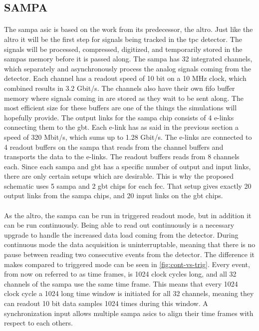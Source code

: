 \documentclass[a4paper, 12pt]{report}
\begin{document}
\subsection{SAMPA}
\label{subsec:sampa}
\paragraph{}
The \gls{sampa} \gls{asic} is based on the work from its predecessor, the \gls{altro}.
Just like the \gls{altro} it will be the first step for signals being tracked in the \gls{tpc} detector.
The signals will be processed, compressed, digitized, and temporarily stored in the \glspl{sampa} memory before it is passed along.
The \gls{sampa} has 32 integrated channels, which separately and asynchronously process the analog signals coming from the detector\cite{tdr-016}.
Each channel has a readout speed of 10 bit on a 10 MHz clock, which combined results in 3.2 Gbit/s.
The channels also have their own \gls{fifo} buffer memory where signals coming in are stored as they wait to be sent along.
The most efficient size for these buffers are one of the things the simulations will hopefully provide.
The output links for the \gls{sampa} chip consists of 4 e-links connecting them to the \gls{gbt}.
Each e-link has as said in the previous section a speed of 320 Mbit/s, which sums up to 1.28 Gbit/s\cite{tdr-015}.
The e-links are connected to 4 readout buffers on the \gls{sampa} that reads from the channel buffers and transports the data to the e-links.
The readout buffers reads from 8 channels each.
Since each \gls{sampa} and \gls{gbt} has a specific number of output and input links, there are only certain setups which are desirable.
This is why the proposed schematic uses 5 \gls{sampa} and 2 \gls{gbt} chips for each \gls{fec}.
That setup gives exactly 20 output links from the \gls{sampa} chips, and 20 input links on the \gls{gbt} chips.

\paragraph{}
As the \gls{altro}, the \gls{sampa} can be run in triggered readout mode, but in addition it can be run continuously.
Being able to read out continuously is a necessary upgrade to handle the increased data load coming from the detector.
During continuous mode the data acquisition is uninterruptable, meaning that there is no pause between reading two consecutive events from the detector.
The difference it makes compared to triggered mode can be seen in \ref{fig:cont-vs-trig}.
Every event, from now on referred to as time frames, is 1024 clock cycles long, and all 32 channels of the \gls{sampa} use the same time frame.
This means that every 1024 clock cycle a 1024 long time window is initiated for all 32 channels, meaning they can readout 10 bit data samples 1024 times during this window.
A synchronization input allows multiple \gls{sampa} \gls{asic}s to align their time frames with respect to each others.\cite{tdr-015}
\end{document}
